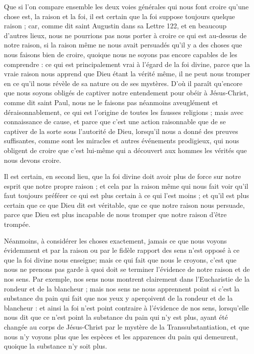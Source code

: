 Que si l'on compare ensemble les deux voies générales qui nous font croire qu'une chose est, la raison et la foi, il est certain que la foi suppose toujours quelque raison ; car, comme dit saint Augustin dans sa Lettre 122, et en beaucoup d'autres lieux, nous ne pourrions pas nous porter à croire ce qui est au-dessus de notre raison, si la raison même ne nous avait persuadés qu'il y a des choses que nous faisons bien de croire, quoique nous ne soyons pas encore capables de les comprendre : ce qui est principalement vrai à l'égard de la foi divine, parce que la vraie raison nous apprend que Dieu étant la vérité même, il ne peut nous tromper en ce qu'il nous révèle de sa nature ou de ses mystères. D'où il paraît qu'encore que nous soyons obligés de captiver notre entendement pour obéir à Jésus-Christ, comme dit saint Paul, nous ne le faisons pas néanmoins aveuglément et déraisonnablement, ce qui est l'origine de toutes les fausses religions ; mais avec connaissance de cause, et parce que c'est une action raisonnable que de se captiver de la sorte sous l'autorité de Dieu, lorsqu'il nous a donné des preuves suffisantes, comme sont les miracles et autres événements prodigieux, qui nous obligent de croire que c'est lui-même qui a découvert aux hommes les vérités que nous devons croire.

Il est certain, en second lieu, que la foi divine doit avoir plus de force sur notre esprit que notre propre raison ; et cela par la raison même qui nous fait voir qu'il faut toujours préférer ce qui est plus certain à ce qui l'est moins ; et qu'il est plus certain que ce que Dieu dit est véritable, que ce que notre raison nous persuade, parce que Dieu est plus incapable de nous tromper que notre raison d'être trompée.

Néanmoins, à considérer les choses exactement, jamais ce que nous voyons évidemment et par la raison ou par le fidèle rapport des sens n'est opposé à ce que la foi divine nous enseigne; mais ce qui fait que nous le croyons, c'est que nous ne prenons pas garde à quoi doit se terminer l'évidence de notre raison et de nos sens. Par exemple, nos sens nous montrent clairement dans l'Eucharistie de la rondeur et de la blancheur ; mais nos sens ne nous apprennent point si c'est la substance du pain qui fait que nos yeux y aperçoivent de la rondeur et de la blancheur : et ainsi la foi n'est point contraire à l'évidence de nos sens, lorsqu'elle nous dit que ce n'est point la substance du pain qui n'y est plus, ayant été changée au corps de Jésus-Christ par le mystère de la Transsubstantiation, et que nous n'y voyons plus que les espèces et les apparences du pain qui demeurent, quoique la substance n'y soit plus.

